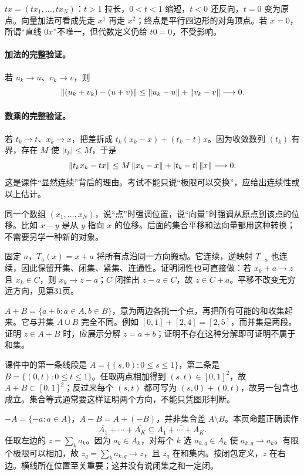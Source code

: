 $t x=(t x_1,\ldots,t x_N)$：$t>1$ 拉长，$0<t<1$ 缩短，$t<0$ 还反向，$t=0$ 变为原点。向量加法可看成先走 $x^1$ 再走 $x^2$；终点是平行四边形的对角顶点。若 $x=0$，所谓“直线 $0x$”不唯一，但代数定义仍给 $t0=0$，不受影响。

\paragraph{加法的完整验证。} 若 $u_k\to u$、$v_k\to v$，则
\[\left\lVert(u_k+v_k)-(u+v)\right\rVert\le\left\lVert u_k-u\right\rVert+\left\lVert v_k-v\right\rVert\longrightarrow0.\]
\paragraph{数乘的完整验证。} 若 $t_k\to t$、$x_k\to x$，把差拆成 $t_k(x_k-x)+(t_k-t)x$。因为收敛数列 $(t_k)$ 有界，存在 $M$ 使 $|t_k|\le M$，于是
\[\left\lVert t_kx_k-tx\right\rVert\le M\left\lVert x_k-x\right\rVert+|t_k-t|\left\lVert x\right\rVert\longrightarrow0.\]
这是课件“显然连续”背后的理由。考试不能只说“极限可以交换”，应给出连续性或以上估计。

同一个数组 $(x_1,\ldots,x_N)$，说“点”时强调位置，说“向量”时强调从原点到该点的位移。比如 $x-y$ 是从 $y$ 指向 $x$ 的位移。后面的集合平移和法向量都用这种转换；不需要另学一种新的对象。

固定 $a$，$T_a(x)=x+a$ 将所有点沿同一方向搬动。它连续，逆映射 $T_{-a}$ 也连续，因此保留开集、闭集、紧集、连通性。证明闭性也可直接做：若 $x_k+a\to z$ 且 $x_k\in C$，则 $x_k\to z-a$；$C$ 闭推出 $z-a\in C$，故 $z\in C+a$。平移不改变无穷远方向，见第31页。

$A+B=\{a+b:a\in A,b\in B\}$，意为两边各挑一个点，再把所有可能的和收集起来。它与并集 $A\cup B$ 完全不同。例如 $[0,1]+[2,4]=[2,5]$，而并集是两段。证明 $z\in A+B$ 时，应展示分解 $z=a+b$；证明不存在这种分解即可证明不属于和集。

课件中的第一条线段是 $A=\{(s,0):0\le s\le1\}$，第二条是 $B=\{(0,t):0\le t\le1\}$。任取两点相加得到 $(s,t)\in[0,1]^2$，故 $A+B\subset[0,1]^2$；反过来每个 $(s,t)$ 都可写为 $(s,0)+(0,t)$，故另一包含也成立。集合等式通常要这样证明两个方向，不能只凭图形判断。

$-A=\{-a:a\in A\}$，$A-B=A+(-B)$，并非集合差 $A\setminus B$。本页命题正确读作
\[\overline{A_1}+\cdots+\overline{A_K}\subseteq\overline{A_1+\cdots+A_K}.\]
任取左边的 $z=\sum_k a_k$。因为 $a_k\in\overline{A_k}$，对每个 $k$ 选 $a_{k,q}\in A_k$ 使 $a_{k,q}\to a_k$。有限个极限可以相加，故 $z_q=\sum_k a_{k,q}\to z$，且 $z_q$ 在和集内。按闭包定义，$z$ 在右边。横线所在位置至关重要；这并没有说闭集之和一定闭。


